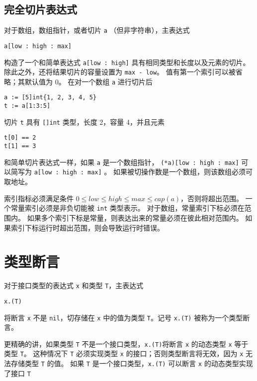 \subsection{完全切片表达式}
对于数组，数组指针，或者切片 \lstinline|a| （但非字符串），主表达式
\begin{lstlisting}[style=golang]
a[low : high : max]
\end{lstlisting}
构造了一个和简单表达式 \lstinline|a[low : high]| 具有相同类型和长度以及元素的切片。
除此之外，还将结果切片的容量设置为 \lstinline|max - low|。
值有第一个索引可以被省略；其默认值为 0。
在对一个数组 \lstinline|a| 进行切片后
\begin{lstlisting}[style=golang]
a := [5]int{1, 2, 3, 4, 5}
t := a[1:3:5]
\end{lstlisting}
切片 \lstinline|t| 具有 \lstinline|[]int| 类型，长度 2，容量 4，并且元素 
\begin{lstlisting}[style=golang]
t[0] == 2
t[1] == 3
\end{lstlisting}

和简单切片表达式一样，如果 \lstinline|a| 是一个数组指针，
\lstinline|(*a)[low : high : max]| 可以简写为 \lstinline|a[low : high : max]| 。
如果被切操作数是一个数组，则该数组必须可取地址。

索引指标必须满足条件 $0 \leq low \leq high \leq max \leq cap(a)$，否则将超出范围。
一个常量索引必须是非负切能被 \lstinline|int| 类型表示。
对于数组，常量索引下标必须在范围内。
如果多个索引下标是常量，则表达出来的常量必须在彼此相对范围内。
如果索引下标运行时超出范围，则会导致运行时错误。

\section{类型断言}
对于接口类型的表达式 \lstinline|x| 和类型 \lstinline|T|，主表达式
\begin{lstlisting}[style=golang]
x.(T)
\end{lstlisting}
将断言 \lstinline|x| 不是 \lstinline|nil|，切存储在 \lstinline|x| 中的值为类型 \lstinline|T|。记号 \lstinline|x.(T)| 被称为一个类型断言。

更精确的讲，如果类型 \lstinline|T| 不是一个接口类型，\lstinline|x.(T)|将断言 \lstinline|x| 的动态类型 \lstinline|x| 等于类型 \lstinline|T|。 
这种情况下 \lstinline|T| 必须实现类型 \lstinline|x| 的接口；否则类型断言将无效，因为 \lstinline|x| 无法存储类型 \lstinline|T| 的值。
如果 \lstinline|T| 是一个接口类型，\lstinline|x.(T)| 可以断言 \lstinline|x| 的动态类型实现了接口 \lstinline|T|

